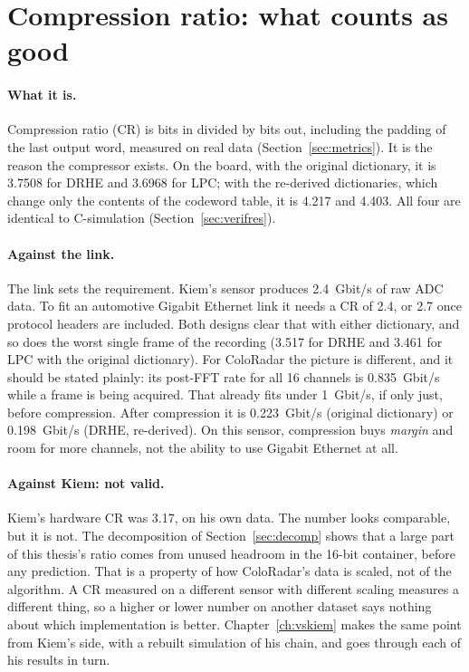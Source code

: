\section{Compression ratio: what counts as good}
\label{sec:hw_cr}

\paragraph{What it is.} Compression ratio (CR) is bits in divided by bits out,
including the padding of the last output word, measured on real data
(Section~\ref{sec:metrics}). It is the reason the compressor exists. On the
board, with the original dictionary, it is \num{3.7508} for DRHE and
\num{3.6968} for LPC; with the re-derived dictionaries, which change only the
contents of the codeword table, it is \num{4.217} and \num{4.403}. All four are
identical to C-simulation (Section~\ref{sec:verifres}).

\paragraph{Against the link.} The link sets the requirement. Kiem's sensor
produces \SI{2.4}{Gbit/s} of raw ADC data. To fit an automotive Gigabit
Ethernet link it needs a CR of 2.4, or 2.7 once protocol headers are included.
Both designs clear that with either dictionary, and so does the worst single
frame of the recording (\num{3.517} for DRHE and \num{3.461} for LPC with the
original dictionary). For ColoRadar the picture is different, and it should be
stated plainly: its post-FFT rate for all 16 channels is \SI{0.835}{Gbit/s}
while a frame is being acquired. That already fits under \SI{1}{Gbit/s}, if only
just, before compression. After compression it is \SI{0.223}{Gbit/s} (original
dictionary) or \SI{0.198}{Gbit/s} (DRHE, re-derived). On this sensor,
compression buys \emph{margin} and room for more channels, not the ability to
use Gigabit Ethernet at all.

\paragraph{Against Kiem: not valid.} Kiem's hardware CR was 3.17, on his own
data. The number looks comparable, but it is not. The decomposition of
Section~\ref{sec:decomp} shows that a large part of this thesis's ratio comes
from unused headroom in the 16-bit container, before any prediction. That is a property of how ColoRadar's data is scaled, not
of the algorithm. A CR measured on a different sensor with different scaling
measures a different thing, so a higher or lower number on another dataset says
nothing about which implementation is better. Chapter~\ref{ch:vskiem} makes the
same point from Kiem's side, with a rebuilt simulation of his chain, and goes
through each of his results in turn.

